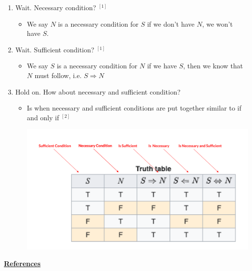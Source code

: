 \documentclass[12pt]{article}
\begin{document}
\begin{itemize}
\begin{mdframed}
        \begin{enumerate}
            \item Wait. Necessary condition? $^{[1]}$
            \begin{itemize}
                \item We say $N$ is a necessary condition for $S$ if we don't have $N$,
                we won't have $S$.
            \end{itemize}
            \item Wait. Sufficient condition? $^{[1]}$
            \begin{itemize}
                \item We say $S$ is a necessary condition for $N$ if we have $S$,
                then we know that $N$ must follow, i.e. $S \Rightarrow N$
            \end{itemize}
            \item Hold on. How about necessary and sufficient condition?
            \begin{itemize}
                \item Is when necessary and sufficient conditions are put together
                similar to if and only if $^{[2]}$

                \begin{center}
                    \includegraphics[width=0.8\linewidth]{images/week_10_notes_1_2.png}
                \end{center}
            \end{itemize}
        \end{enumerate}

    \end{mdframed}

    \bigskip

    \underline{\textbf{References}}

    \bigskip


\end{itemize}
\end{document}

